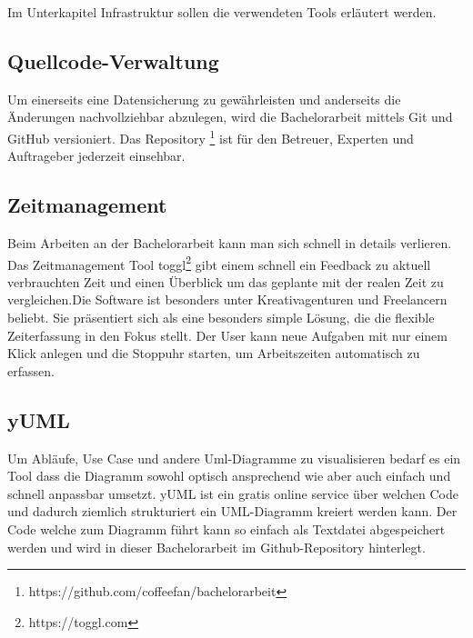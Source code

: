 Im Unterkapitel Infrastruktur sollen die verwendeten Tools erläutert
werden.

\subsection{Quellcode-Verwaltung}\label{quellcode-verwaltung}

Um einerseits eine Datensicherung zu gewährleisten und anderseits die
Änderungen nachvollziehbar abzulegen, wird die Bachelorarbeit mittels
Git und GitHub versioniert. Das Repository \footnote{https://github.com/coffeefan/bachelorarbeit}
ist für den Betreuer, Experten und Auftrageber jederzeit einsehbar.

\subsection{Zeitmanagement}\label{zeitmanagement}

Beim Arbeiten an der Bachelorarbeit kann man sich schnell in details
verlieren. Das Zeitmanagement Tool toggl\footnote{https://toggl.com}
gibt einem schnell ein Feedback zu aktuell verbrauchten Zeit und einen
Überblick um das geplante mit der realen Zeit zu vergleichen.Die
Software ist besonders unter Kreativagenturen und Freelancern beliebt.
Sie präsentiert sich als eine besonders simple Lösung, die die flexible
Zeiterfassung in den Fokus stellt. Der User kann neue Aufgaben mit nur
einem Klick anlegen und die Stoppuhr starten, um Arbeitszeiten
automatisch zu erfassen.

\newpage

\subsection{yUML}\label{yuml}

Um Abläufe, Use Case und andere Uml-Diagramme zu visualisieren bedarf es
ein Tool dass die Diagramm sowohl optisch ansprechend wie aber auch
einfach und schnell anpassbar umsetzt. yUML ist ein gratis online
service über welchen Code und dadurch ziemlich strukturiert ein
UML-Diagramm kreiert werden kann. Der Code welche zum Diagramm führt
kann so einfach als Textdatei abgespeichert werden und wird in dieser
Bachelorarbeit im Github-Repository hinterlegt.

